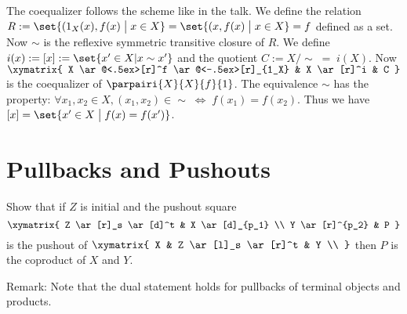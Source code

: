 \begin{answer}
  The coequalizer follows the scheme like in the talk.
  We define the relation $R := \set{ (1_X (x), f(x) \;\big|\; x \in X} = \set{ (x, f(x) \;\big|\; x \in X} = f$ defined as a set.
  Now $\sim$ is the reflexive symmetric transitive closure of $R$.
  We define $i(x) := [x] := \set{ x' \in X | x \sim x'}$
  and the quotient $C := X / \sim \;=\; i(X)$.
  Now
  $ \xymatrix{
    X \ar@<.5ex>[r]^f \ar@<-.5ex>[r]_{1_X} & X \ar[r]^i & C
  } $
  is the coequalizer of $\parpairi{X}{X}{f}{1}$.
  The equivalence $\sim$ has the property:
  $\forall x_1, x_2 \in X, (x_1, x_2) \in \sim \;\Leftrightarrow\; f(x_1) = f(x_2).$
  Thus we have $[x] = \set{x' \in X \;\big|\; f(x) = f(x')}$.

\end{answer}

\section{Pullbacks and Pushouts}

\begin{exercise}
  Show that if $Z$ is initial and the pushout square
  \[ \xymatrix{
    Z \ar[r]_s \ar[d]^t & X \ar[d]_{p_1} \\
    Y \ar[r]^{p_2} & P
  } \]
  is the pushout of
  $ \xymatrix{
    X & Z \ar[l]_s \ar[r]^t & Y \\
  } $
  then $P$ is the coproduct of $X$ and $Y$.

  Remark: Note that the dual statement holds for pullbacks of terminal objects and products.
\end{exercise}


